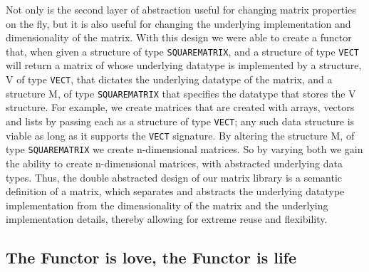 \documentclass[9pt,letterpaper]{extarticle}
\begin{document}
  Not only is the second layer of abstraction useful for changing matrix
  properties on the fly, but it is also useful for changing the underlying
  implementation and dimensionality of the matrix. With this design we were able
  to create a functor that, when given a structure of type
  \texttt{SQUAREMATRIX}, and a structure of type \texttt{VECT} will return a
  matrix of whose underlying datatype is implemented by a structure, V of type
  \texttt{VECT}, that dictates the underlying datatype of the matrix, and a
  structure M, of type \texttt{SQUAREMATRIX} that specifies the datatype that
  stores the V structure. For example, we create matrices that are created with
  arrays, vectors and lists by passing each as a structure of type
  \texttt{VECT}; any such data structure is viable as long as it supports the
  \texttt{VECT} signature. By altering the structure M, of type
  \texttt{SQUAREMATRIX} we create n-dimensional matrices. So by varying both we
  gain the ability to create n-dimensional matrices, with abstracted underlying
  data types. Thus, the double abstracted design of our matrix library is a
  semantic definition of a matrix, which separates and abstracts the underlying
  datatype implementation from the dimensionality of the matrix and the
  underlying implementation details, thereby allowing for extreme reuse and
  flexibility.
  
  \subsection{The Functor is love, the Functor is life}
\end{document}
